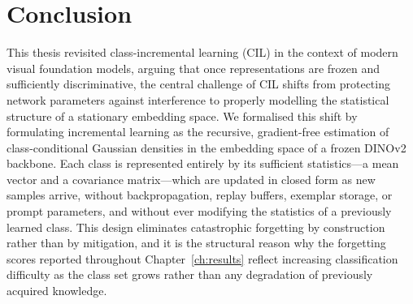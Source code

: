 \chapter{Conclusion}
\label{ch:conclusion}

This thesis revisited class-incremental learning (CIL) in the context of modern visual foundation models, arguing that once representations are frozen and sufficiently discriminative, the central challenge of CIL shifts from protecting network parameters against interference to properly modelling the statistical structure of a stationary embedding space. We formalised this shift by formulating incremental learning as the recursive, gradient-free estimation of class-conditional Gaussian densities in the embedding space of a frozen DINOv2 backbone. Each class is represented entirely by its sufficient statistics---a mean vector and a covariance matrix---which are updated in closed form as new samples arrive, without backpropagation, replay buffers, exemplar storage, or prompt parameters, and without ever modifying the statistics of a previously learned class. This design eliminates catastrophic forgetting by construction rather than by mitigation, and it is the structural reason why the forgetting scores reported throughout Chapter~\ref{ch:results} reflect increasing classification difficulty as the class set grows rather than any degradation of previously acquired knowledge.

